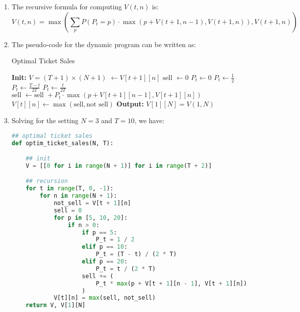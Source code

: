 \documentclass{article}
\begin{document}
\begin{enumerate}
\begin{enumerate}
        \item The recursive formula for computing $V(t,n)$ is:
        \begin{equation}
            V(t, n) = \max\left(\sum_{p} P(P_t=p) \cdot \max(p + V(t+1, n-1), V(t+1, n)), V(t+1, n)\right)
        \end{equation}

        \item The pseudo-code for the dynamic program can be written as:
        \begin{algorithm}[H]
        \caption{Optimal Ticket Sales}
        \begin{algorithmic}[1]
        \STATE \textbf{Init:} $V = (T+1) \times (N+1)$
        \STATE {}$\gets V[t+1][n]$
        \STATE $\text{sell } \gets 0$
        \STATE $P_{t} \gets 0$
        \STATE $P_{t} \gets \frac{1}{2}$
        \STATE $P_{t} \gets \frac{T - t}{2T}$
        \STATE $P_{t} \gets \frac{t}{2T}$
        \ENDIF
        \STATE $\text{sell } \gets \text{sell } + P_{t} \cdot \max(p + V[t+1][n-1], V[t+1][n])$
        \ENDIF
        \ENDFOR
        \STATE $V[t][n] \gets \max(\text{sell}, \text{not sell})$
        \ENDFOR
        \ENDFOR
        \STATE \textbf{Output:} $V[1][N] = V(1, N)$
        \end{algorithmic}
        \end{algorithm}
        
        \item Solving for the setting $N = 3$ and $T = 10$, we have:
        \begin{lstlisting}[language=Python, title=Fig. Python 1(d)]
## optimal ticket sales
def optim_ticket_sales(N, T):

    ## init
    V = [[0 for i in range(N + 1)] for i in range(T + 2)]

    ## recursion
    for t in range(T, 0, -1):
        for n in range(N + 1):
            not_sell = V[t + 1][n]
            sell = 0
            for p in [5, 10, 20]:
                if n > 0:
                    if p == 5:
                        P_t = 1 / 2
                    elif p == 10:
                        P_t = (T - t) / (2 * T)
                    elif p == 20:
                        P_t = t / (2 * T)
                    sell += (
                        P_t * max(p + V[t + 1][n - 1], V[t + 1][n])
                    )
            V[t][n] = max(sell, not_sell)
    return V, V[1][N]


\end{lstlisting}
\end{enumerate}
\end{enumerate}
\end{document}
